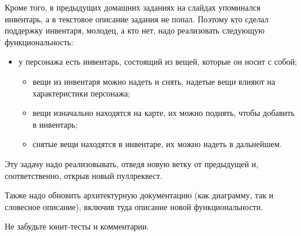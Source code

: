 \documentclass[a5paper]{homework}
\begin{document}
Кроме того, в предыдущих домашних заданиях на слайдах упоминался инвентарь, а в текстовое описание задания не попал. Поэтому кто сделал поддержку инвентаря, молодец, а кто нет, надо реализовать следующую функциональность:

\begin{itemize}
    \item у персонажа есть инвентарь, состоящий из вещей, которые он носит с собой;
    \begin{itemize}
        \item вещи из инвентаря можно надеть и снять, надетые вещи влияют на характеристики персонажа;
        \item вещи изначально находятся на карте, их можно поднять, чтобы добавить в инвентарь;
        \item снятые вещи находятся в инвентаре, их можно надеть в дальнейшем.
    \end{itemize}
\end{itemize}

Эту задачу надо реализовывать, отведя новую ветку от предыдущей и, соответственно, открыв новый пуллреквест. 

Также надо обновить архитектурную документацию (как диаграмму, так и словесное описание), включив туда описание новой функциональности.

Не забудьте юнит-тесты и комментарии.
\end{document}
